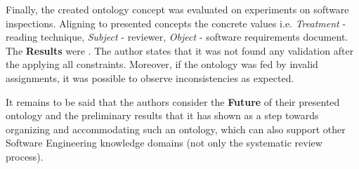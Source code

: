 	Finally, the created ontology concept was evaluated on experiments on software inspections\cite{Bas99}. Aligning to presented concepts the concrete values i.e. \textit{Treatment} - reading technique, \textit{Subject} - reviewer, \textit{Object} - software requirements document. The \textbf{Results} were \frqq\cite{SiyWu12}. The author states that it was not found any validation after the applying all constraints. Moreover, if the ontology was fed by invalid assignments, it was possible to observe inconsistencies as expected.
	
	It remains to be said that the authors consider the \textbf{Future} of their presented ontology and the preliminary results that it has shown as a step towards organizing and accommodating such an ontology, which can also support other Software Engineering knowledge domains (not only the systematic review process).  \newline
	
